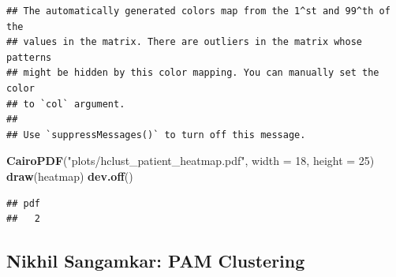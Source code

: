 \documentclass[
]{article}
\newenvironment{Shaded}{\begin{snugshade}}{\end{snugshade}}
\newcommand{\AttributeTok}[1]{\textcolor[rgb]{0.13,0.29,0.53}{#1}}
\newcommand{\DecValTok}[1]{\textcolor[rgb]{0.00,0.00,0.81}{#1}}
\newcommand{\FunctionTok}[1]{\textcolor[rgb]{0.13,0.29,0.53}{\textbf{#1}}}
\newcommand{\NormalTok}[1]{#1}
\newcommand{\StringTok}[1]{\textcolor[rgb]{0.31,0.60,0.02}{#1}}
\begin{document}
\begin{verbatim}
## The automatically generated colors map from the 1^st and 99^th of the
## values in the matrix. There are outliers in the matrix whose patterns
## might be hidden by this color mapping. You can manually set the color
## to `col` argument.
## 
## Use `suppressMessages()` to turn off this message.
\end{verbatim}

\begin{Shaded}
\begin{Highlighting}[]
\FunctionTok{CairoPDF}\NormalTok{(}\StringTok{"plots/hclust\_patient\_heatmap.pdf"}\NormalTok{, }\AttributeTok{width =} \DecValTok{18}\NormalTok{, }\AttributeTok{height =} \DecValTok{25}\NormalTok{)}
\FunctionTok{draw}\NormalTok{(heatmap)}
\FunctionTok{dev.off}\NormalTok{()}
\end{Highlighting}
\end{Shaded}

\begin{verbatim}
## pdf 
##   2
\end{verbatim}

\subsection{Nikhil Sangamkar: PAM
Clustering}\label{nikhil-sangamkar-pam-clustering}
\end{document}
